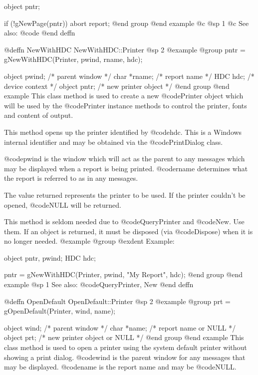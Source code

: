 object  pntr;

if (!gNewPage(pntr))
        abort report;
@end group
@end example
@c @sp 1
@c See also:  @code{}
@end deffn













@deffn {NewWithHDC} NewWithHDC::Printer
@sp 2
@example
@group
pntr = gNewWithHDC(Printer, pwind, rname, hdc); 

object  pwind;  /*  parent window       */
char    *rname; /*  report name         */
HDC     hdc;    /*  device context      */
object  pntr;   /*  new printer object  */
@end group
@end example
This class method is used to create a new @code{Printer} object which
will be used by the @code{Printer} instance methods to control the
printer, fonts and content of output.

This method opens up the printer identified by @code{hdc}.  This is
a Windows internal identifier and may be obtained via the
@code{PrintDialog} class.

@code{pwind} is the window which will act as the parent to any
messages which may be displayed when a report is being printed.
@code{rname} determines what the report is referred to as in any
messages.

The value returned represents the printer to be used.  If the 
printer couldn't be opened, @code{NULL} will be returned.

This method is seldom needed due to @code{QueryPrinter} and @code{New}.
Use them. If an object is returned, it must be disposed (via
@code{Dispose}) when it is no longer needed.
@example
@group
@exdent Example:

object  pntr, pwind;
HDC     hdc;

pntr = gNewWithHDC(Printer, pwind, "My Report", hdc);
@end group
@end example
@sp 1
See also:  @code{QueryPrinter, New}
@end deffn




@deffn {OpenDefault} OpenDefault::Printer
@sp 2
@example
@group
prt = gOpenDefault(Printer, wind, name);

object  wind;  /*  parent window              */
char    *name; /*  report name or NULL        */
object  prt;   /*  new printer object or NULL */
@end group
@end example
This class method is used to open a printer using the system default
printer without showing a print dialog.  @code{wind} is the parent
window for any messages that may be displayed.  @code{name} is the
report name and may be @code{NULL}.

